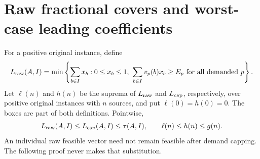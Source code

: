 \section{Raw fractional covers and worst-case leading coefficients}\label{sec:raw}
For a positive original instance, define
\[
 L_{\rm raw}(A,I)=\min\left\{\sum_{b\in I}x_b:0\le x_b\le1,
 \ \sum_{b\in I}v_p(b)x_b\ge E_p\ \text{for all demanded }p\right\}.
\]
Let $\ell(n)$ and $h(n)$ be the suprema of $L_{\rm raw}$ and $L_{\rm cap}$, respectively, over positive original instances with $n$ sources, and put $\ell(0)=h(0)=0$. The boxes are part of both definitions. Pointwise,
\[
 L_{\rm raw}(A,I)\le L_{\rm cap}(A,I)\le\tau(A,I),\qquad
 \ell(n)\le h(n)\le g(n).
\]
An individual raw feasible vector need not remain feasible after demand capping. The following proof never makes that substitution.

